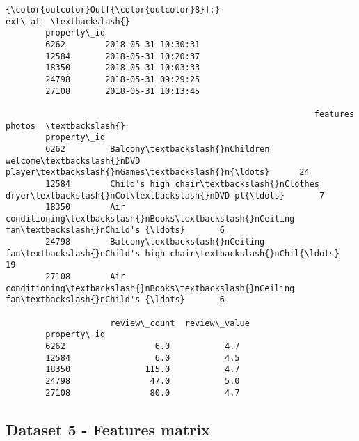 \documentclass[11pt]{article}
\begin{document}
\begin{Verbatim}[commandchars=\\\{\}]
{\color{outcolor}Out[{\color{outcolor}8}]:}                          ext\_at  \textbackslash{}
        property\_id                       
        6262        2018-05-31 10:30:31   
        12584       2018-05-31 10:20:37   
        18350       2018-05-31 10:03:33   
        24798       2018-05-31 09:29:25   
        27108       2018-05-31 10:13:45   
        
                                                              features  photos  \textbackslash{}
        property\_id                                                              
        6262         Balcony\textbackslash{}nChildren welcome\textbackslash{}nDVD player\textbackslash{}nGames\textbackslash{}n{\ldots}      24   
        12584        Child's high chair\textbackslash{}nClothes dryer\textbackslash{}nCot\textbackslash{}nDVD pl{\ldots}       7   
        18350        Air conditioning\textbackslash{}nBooks\textbackslash{}nCeiling fan\textbackslash{}nChild's {\ldots}       6   
        24798        Balcony\textbackslash{}nCeiling fan\textbackslash{}nChild's high chair\textbackslash{}nChil{\ldots}      19   
        27108        Air conditioning\textbackslash{}nBooks\textbackslash{}nCeiling fan\textbackslash{}nChild's {\ldots}       6   
        
                     review\_count  review\_value  
        property\_id                              
        6262                  6.0           4.7  
        12584                 6.0           4.5  
        18350               115.0           4.7  
        24798                47.0           5.0  
        27108                80.0           4.7  
\end{Verbatim}
            
    \subsection{Dataset 5 - Features
matrix}\label{dataset-5---features-matrix}
\end{document}
